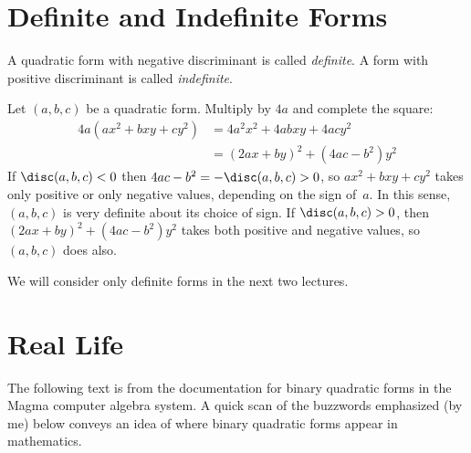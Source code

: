 \documentclass[11pt]{report}
\begin{document}
\section{Definite and Indefinite Forms}
\begin{definition}
  A quadratic form with negative discriminant
  is called {\em definite}.  A form with positive
  discriminant is called {\em indefinite}.
\end{definition}
Let $(a,b,c)$ be a quadratic form.  Multiply by $4a$ and complete
the square:
\begin{align*}
  4a(ax^2+bxy+cy^2) & = 4a^2x^2 + 4abxy + 4acy^2  \\
                    & = (2ax+by)^2 + (4ac-b^2)y^2
\end{align*}
If $\disc(a,b,c)<0$ then $4ac-b^2=-\disc(a,b,c)>0$, so
$ax^2 + bxy+cy^2$ takes only positive or only negative values,
depending on the sign of~$a$.  In this sense, $(a,b,c)$ is very
  {\sf definite} about its choice of sign.  If $\disc(a,b,c)>0$,
then $(2ax+by)^2 + (4ac-b^2)y^2$ takes both positive and negative
values, so $(a,b,c)$ does also.

We will consider only definite forms in the next two lectures.

\section{Real Life}
The following text is from the documentation for binary quadratic
forms in the {\sc Magma} computer algebra system.  A quick scan of the
buzzwords emphasized (by me) below conveys an idea of where
binary quadratic forms appear in mathematics.
\end{document}
